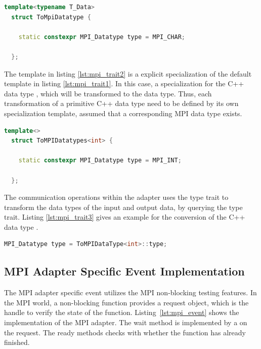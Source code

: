 \begin{lstlisting}[language=C++, label=lst:mpi_trait1]
  template<typename T_Data> 
  struct ToMpiDatatype { 

    static constexpr MPI_Datatype type = MPI_CHAR; 

  };
\end{lstlisting}

\noindent The template in listing \ref{lst:mpi_trait2} is a explicit
specialization of the default template in listing
\ref{lst:mpi_trait1}. In this case, a specialization for the C++ data
type , which will be transformed to the  data type.  Thus,
each transformation of a primitive C++ data type need to be defined
by its own specialization template, assumed that a corresponding
MPI data type exists.

\begin{lstlisting}[language=C++, label=lst:mpi_trait2]
  template<>
  struct ToMPIDatatypes<int> { 

    static constexpr MPI_Datatype type = MPI_INT; 

  };
\end{lstlisting}

\noindent The communication operations within the adapter uses the type trait to
transform the data types of the input and output data, by querying the
type trait. Listing \ref{lst:mpi_trait3} gives an example for the conversion 
of the C++ data type .

\begin{lstlisting}[language=C++, label=lst:mpi_trait3]
  MPI_Datatype type = ToMPIDataType<int>::type;
\end{lstlisting}

\subsection{MPI Adapter Specific Event Implementation}
The MPI adapter specific event utilizes the MPI non-blocking testing
features. In the MPI world, a non-blocking function provides a request
object, which is the handle to verify the state of the
function. Listing~\ref{lst:mpi_event} shows the 
implementation of the MPI adapter.  The wait method is implemented by
a  on the request. The ready methods checks with
 whether the function has already finished.


